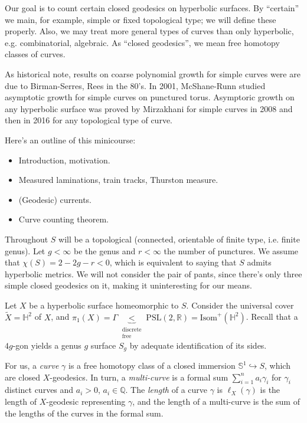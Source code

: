 \medskip\noindent
Our goal is to count certain closed geodesics
on hyperbolic surfaces.
By ``certain'' we main, for example, simple
or fixed topological type;
we will define these properly. Also, we may
treat more general
types of curves than only hyperbolic, e.g.
combinatorial, algebraic.
As ``closed geodesics'', we mean free
homotopy classes of curves.

As historical note,
results on coarse polynomial growth for
simple curves
were are due to Birman-Serres, Rees in the
80's.
In 2001, McShane-Runn studied asymptotic
growth
for simple curves on punctured torus.
Asymptoric growth on any hyperbolic
surface was proved by Mirzakhani for simple
curves in 2008
and then in 2016 for any topological type of
curve.

Here's an outline of this minicourse:
\begin{itemize}
\item Introduction, motivation.
\item Measured laminations, train tracks,
Thurston measure.
\item  (Geodesic) currents.
\item Curve counting theorem.
\end{itemize}

\medskip\noindent
Throughout $S$ will be a topological
(connected, orientable
of finite type, i.e. finite genus). Let
$g<\infty$ be the genus
and $r< \infty$ the number of punctures.
We assume that $\chi(S)=2-2g-r<0$,
which is equivalent to saying that $S$
admits hyperbolic metrics.
We will not consider the pair of pants,
since there's only three simple closed
geodesics on it,
making it uninteresting for our means.

Let $X$ be a hyperbolic surface homeomorphic
to $S$.
Consider the universal cover
$\tilde{X}=\mathbb{H}^2$ of $X$,
and
$\pi_1(X)=\Gamma\underbrace{<}
_{\substack{\text{discrete}
\\ \text{free}}}
\text{PSL}(2,\mathbb{R})=\text{Isom}^+
(\mathbb{H}^2)$.
Recall that a $4g$-gon yields a genus $g$
surface $S_g$ by
adequate identification of its sides.

For us, a {\it curve} $\gamma$ is a free
homotopy class
of a closed immersion $\mathbb{S}^1
\hookrightarrow S$,
which are closed $X$-geodesics.
In turn, a {\it multi-curve}
is a formal sum $\sum_{i=1}^na_i\gamma_i$
for $\gamma_i$ distinct curves and $a_i>0$,
$a_i \in \mathbb{Q}$.
The {\it length} of a curve $\gamma$ is
$\ell_X(\gamma)$ is the length of
$X$-geodesic representing $\gamma$,
and the length of a multi-curve is the sum of
the lengths
of the curves in the formal sum.

